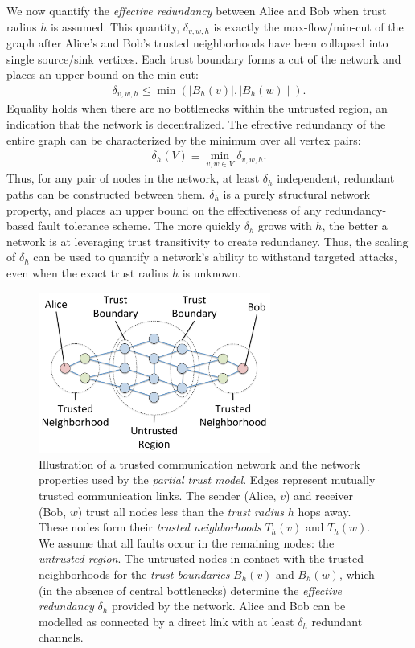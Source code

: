 \documentclass{sig-alternate-05-2015}
\newcommand{\beq}{\begin{eqnarray}}
\newcommand{\eeq}{\end{eqnarray}}
\begin{document}
We now quantify the {\em effective redundancy} between Alice and Bob
when trust radius $h$ is assumed.
This quantity, $\delta_{v,w,h}$ is exactly the max-flow/min-cut of
the graph after Alice's and Bob's trusted neighborhoods have been
collapsed into single source/sink vertices.
Each trust boundary forms a cut of the network and places an upper bound on the
min-cut:
\beq
\delta_{v,w,h} \leq \min\left( \mid B_h(v) \mid, \mid B_h(w) \mid \right).
\eeq
Equality holds when there are no bottlenecks within the untrusted region,
an indication that the network is decentralized.
The efrective redundancy of the entire graph can be characterized by the minimum over
all vertex pairs:
\beq
\delta_h(V) \equiv \min_{v,w \in V} \delta_{v,w,h}.
\eeq
Thus, for any pair of nodes in the network, at least $\delta_h$ independent,
redundant paths can be constructed between them.
$\delta_h$ is a purely structural network property,
and places an upper bound on the effectiveness of any
redundancy-based fault tolerance scheme.
The more quickly $\delta_h$ grows with $h$,
the better a network is at leveraging trust transitivity to create redundancy.
Thus, the scaling of $\delta_h$ can be used to quantify a network's ability
to withstand targeted attacks,
even when the exact trust radius $h$ is unknown.

\begin{figure}
\centerline{\includegraphics[width=3in,height=2.08in]{fig-partial-trust}}
\caption{
Illustration of a trusted communication network and the network properties
used by the {\em partial trust model}.
Edges represent mutually trusted communication links.
The sender (Alice, $v$) and receiver (Bob, $w$) trust all nodes
less than the {\em trust radius} $h$ hops away.
These nodes form their {\em trusted neighborhoods} $T_h(v)$ and $T_h(w)$.
We assume that all faults occur in the remaining nodes: the
{\em untrusted region}.
The untrusted nodes in contact with the trusted neighborhoods for the
{\em trust boundaries} $B_h(v)$ and $B_h(w)$,
which (in the absence of central bottlenecks) determine the
{\em effective redundancy} $\delta_h$ provided by the network.
Alice and Bob can be modelled as connected by a direct link with
at least $\delta_h$ redundant channels.
}
\label{fig:trust-source}
\end{figure}
\end{document}
